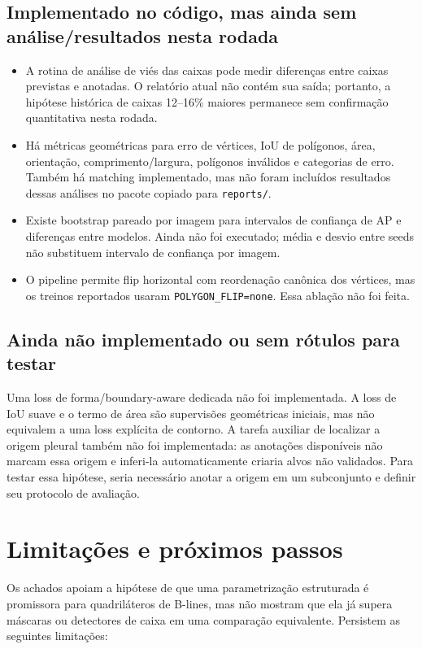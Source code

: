 \documentclass[10pt]{article}
\begin{document}
\subsection{Implementado no código, mas ainda sem análise/resultados nesta rodada}

\begin{itemize}
  \item A rotina de análise de viés das caixas pode medir diferenças entre
  caixas previstas e anotadas. O relatório atual não contém sua saída; portanto,
  a hipótese histórica de caixas 12--16\% maiores permanece sem confirmação
  quantitativa nesta rodada.
  \item Há métricas geométricas para erro de vértices, IoU de polígonos, área,
  orientação, comprimento/largura, polígonos inválidos e categorias de erro.
  Também há matching implementado, mas não foram incluídos resultados dessas
  análises no pacote copiado para \texttt{reports/}.
  \item Existe bootstrap pareado por imagem para intervalos de confiança de AP e
  diferenças entre modelos. Ainda não foi executado; média e desvio entre seeds
  não substituem intervalo de confiança por imagem.
  \item O pipeline permite flip horizontal com reordenação canônica dos vértices,
  mas os treinos reportados usaram \texttt{POLYGON\_FLIP=none}. Essa ablação não
  foi feita.
\end{itemize}

\subsection{Ainda não implementado ou sem rótulos para testar}

Uma loss de forma/boundary-aware dedicada não foi implementada. A loss de IoU
suave e o termo de área são supervisões geométricas iniciais, mas não equivalem
a uma loss explícita de contorno. A tarefa auxiliar de localizar a origem
pleural também não foi implementada: as anotações disponíveis não marcam essa
origem e inferi-la automaticamente criaria alvos não validados. Para testar essa
hipótese, seria necessário anotar a origem em um subconjunto e definir seu
protocolo de avaliação.

\section{Limitações e próximos passos}

Os achados apoiam a hipótese de que uma parametrização estruturada é promissora
para quadriláteros de B-lines, mas não mostram que ela já supera máscaras ou
detectores de caixa em uma comparação equivalente. Persistem as seguintes
limitações:
\end{document}
